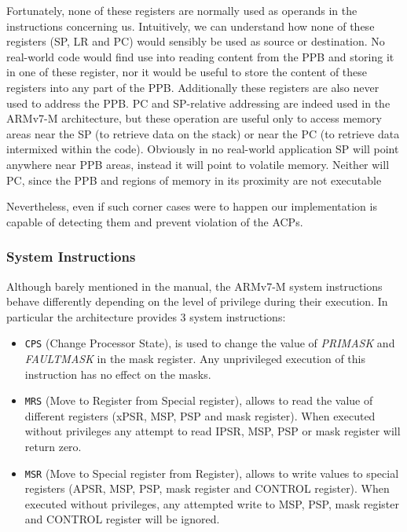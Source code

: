 \documentclass{article}
\begin{document}
Fortunately, none of these registers are normally used as operands in the instructions concerning us. Intuitively, we can understand how none of these registers (SP, LR and PC) would sensibly be used as source or destination. No real-world code would find use into reading content from the PPB and storing it in one of these register, nor it would be useful to store the content of these registers into any part of the PPB. Additionally these registers are also never used to address the PPB. PC and SP-relative addressing are indeed used in the ARMv7-M architecture, but these operation are useful only to access memory areas near the SP (to retrieve data on the stack) or near the PC (to retrieve data intermixed within the code). Obviously in no real-world application SP will point anywhere near PPB areas, instead it will point to volatile memory. Neither will PC, since the PPB and regions of memory in its proximity are not executable

Nevertheless, even if such corner cases were to happen our implementation is capable of detecting them and prevent violation of the ACPs.

\subsubsection{System Instructions}
\label{subsubsec:system_instructions}
Although barely mentioned in the manual, the ARMv7-M system instructions behave differently depending on the level of privilege during their execution. In particular the architecture provides 3 system instructions:
\begin{itemize}
	\item \verb|CPS| (Change Processor State), is used to change the value of \textit{PRIMASK} and \textit{FAULTMASK} in the mask register. Any unprivileged execution of this instruction has no effect on the masks.
	\item \verb|MRS| (Move to Register from Special register), allows to read the value of different registers (xPSR, MSP, PSP and mask register). When executed without privileges any attempt to read IPSR, MSP, PSP or mask register will return zero.
	\item \verb|MSR| (Move to Special register from Register), allows to write values to special registers (APSR, MSP, PSP, mask register and CONTROL register). When executed without privileges, any attempted write to MSP, PSP, mask register and CONTROL register will be ignored.
\end{itemize}
\end{document}
